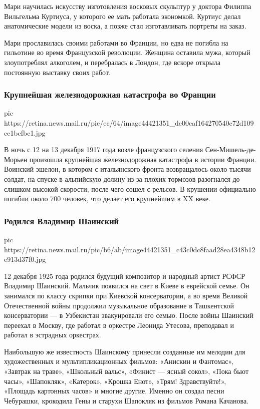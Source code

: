 Мари научилась искусству изготовления восковых скульптур у доктора Филиппа
Вильгельма Куртиуса, у которого ее мать работала экономкой. Куртиус делал
анатомические модели из воска, а позже стал изготавливать портреты на заказ.

Мари прославилась своими работами во Франции, но едва не погибла на гильотине
во время Французской революции. Женщина оставила мужа, который злоупотреблял
алкоголем, и перебралась в Лондон, где вскоре открыла постоянную выставку своих
работ.

\subsubsection{Крупнейшая железнодорожная катастрофа во Франции}

\ifcmt
  pic https://retina.news.mail.ru/pic/ec/64/image44421351_de00caf164270540c72d109ce1bcfbc1.jpg
\fi

В ночь с 12 на 13 декабря 1917 года возле французского селения
Сен-Мишель-де-Морьен произошла крупнейшая железнодорожная катастрофа в истории
Франции. Воинский эшелон, в котором с итальянского фронта возвращалось около
тысячи солдат, на спуске в альпийскую долину из-за плохих тормозов разогнался
до слишком высокой скорости, после чего сошел с рельсов. В крушении официально
погибли около 700 человек, что делает его крупнейшим в XX веке.

\subsubsection{Родился Владимир Шаинский}

\ifcmt
  pic https://retina.news.mail.ru/pic/b6/ab/image44421351_c43c0dc8faad28ea4348b12e913d37f0.jpg
\fi


12 декабря 1925 года родился будущий композитор и народный артист РСФСР
Владимир Шаинский. Мальчик появился на свет в Киеве в еврейской семье. Он
занимался по классу скрипки при Киевской консерватории, а во время Великой
Отечественной войны продолжил музыкальное образование в Ташкентской
консерватории — в Узбекистан эвакуировали его семью. После войны Шаинский
переехал в Москву, где работал в оркестре Леонида Утесова, преподавал и работал
в эстрадных оркестрах.

Наибольшую же известность Шаинскому принесли созданные им мелодии для
художественных и мультипликационных фильмов: «Анискин и Фантомас», «Завтрак на
траве», «Школьный вальс», «Финист — ясный сокол», «Пока бьют часы», «Шапокляк»,
«Катерок», «Крошка Енот», «Трям! Здравствуйте!», «Площадь картонных часов» и
многие другие. Именно он создал песни Чебурашки, крокодила Гены и старухи
Шапокляк из фильмов Романа Качанова.


